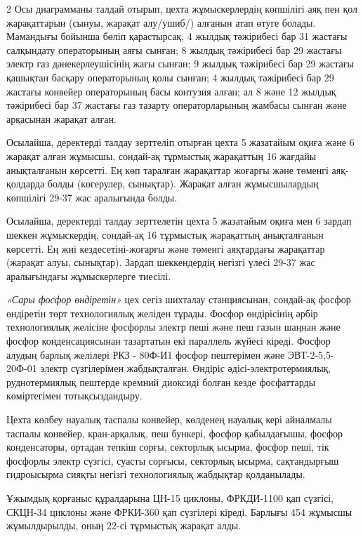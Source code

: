 \begin{multicols}{2}
Осы диаграмманы талдай отырып, цехта жұмыскерлердің көпшілігі аяқ пен
қол жарақаттарын (сынуы, жарақат алу/ушиб/) алғанын атап өтуге болады.
Мамандығы бойынша бөліп қарастырсақ, 4 жылдық тәжірибесі бар 31 жастағы
салқындату операторының аяғы сынған; 8 жылдық тәжірибесі бар 29 жастағы
электр газ дәнекерлеушісінің жағы сынған; 9 жылдық тәжірибесі бар 29
жастағы қашықтан басқару операторының қолы сынған; 4 жылдық тәжірибесі
бар 29 жастағы конвейер операторының басы контузия алған; ал 8 және 12
жылдық тәжірибесі бар 37 жастағы газ тазарту операторларының жамбасы
сынған және арқасынан жарақат алған.

Осылайша, деректерді талдау зерттеліп отырған цехта 5 жазатайым оқиға
және 6 жарақат алған жұмысшы, сондай-ақ тұрмыстық жарақаттың 16 жағдайы
анықталғанын көрсетті. Ең көп таралған жарақаттар жоғарғы және төменгі
аяқ-қолдарда болды (көгерулер, сынықтар). Жарақат алған жұмысшылардың
көпшілігі 29-37 жас аралығында болды.

Осылайша, деректерді талдау зерттелетін цехта 5 жазатайым оқиға мен 6
зардап шеккен жұмыскердің, сондай-ақ 16 тұрмыстық жарақаттың
анықталғанын көрсетті. Ең жиі кездесетіні-жоғарғы және төменгі
аяқтардағы жарақаттар (жарақат алуы, сынықтар). Зардап шеккендердің
негізгі үлесі 29-37 жас аралығындағы жұмыскерлерге тиесілі.

\emph{«Сары фосфор өндіретін»} цех сегіз шихталау станциясынан,
сондай-ақ фосфор өндіретін төрт технологиялық желіден тұрады. Фосфор
өндірісінің әрбір технологиялық желісіне фосфорлы электр пеші және пеш
газын шаңнан және фосфор конденсациясынан тазартатын екі параллель
жүйесі кіреді. Фосфор алудың барлық желілері РКЗ - 80Ф-И1 фосфор
пештерімен және ЭВТ-2-5,5-20Ф-01 электр сүзгілерімен жабдықталған.
Өндіріс әдісі-электротермиялық, руднотермиялық пештерде кремний диоксиді
болған кезде фосфаттарды көміртегімен тотықсыздандыру.

Цехта көлбеу науалық таспалы конвейер, көлденең науалық кері айналмалы
таспалы конвейер, кран-арқалық, пеш бункері, фосфор қабылдағышы, фосфор
конденсаторы, ортадан тепкіш сорғы, секторлық ысырма, фосфор пеші, тік
фосфорлы электр сүзгісі, суасты сорғысы, секторлық ысырма, сақтандырғыш
гидроысырма сияқты негізгі технологиялық жабдықтар қолданылады.

Ұжымдық қорғаныс құралдарына ЦН-15 циклоны, ФРКДИ-1100 қап сүзгісі,
СКЦН-34 циклоны және ФРКИ-360 қап сүзгілері кіреді. Барлығы 454 жұмысшы
жұмылдырылды, оның 22-сі тұрмыстық жарақат алды.
\end{multicols}

